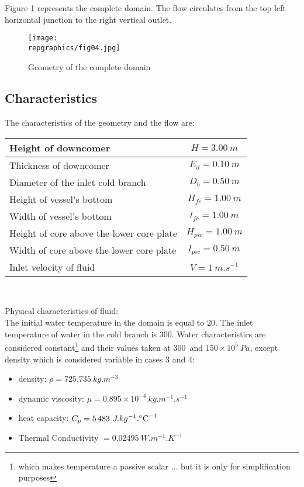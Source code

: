 Figure \ref{figante21} represents the complete domain. The flow circulates from
the top left horizontal junction to the right vertical outlet.

\begin{figure}[h!]
\begin{center}
\texttt{[image: \\repgraphics/fig04.jpg]}
\caption{Geometry of the complete domain}
\label{figante21}
\end{center}
\end{figure}


        \subsection{Characteristics}

The characteristics of the geometry and the flow are:
\begin{center}
\begin{tabular}{|l|c|}
\hline
Height of downcomer & $H = 3.00\ m$ \\
\hline
Thickness of downcomer & $E_{d} = 0.10\ m$ \\
\hline
Diameter of the inlet cold branch & $D_{b} = 0.50\ m$ \\
\hline
Height of vessel's bottom & $H_{fc} = 1.00\ m$ \\
\hline
Width of vessel's bottom & $l_{fc} = 1.00\ m$ \\
\hline
Height of core above the lower core plate & $H_{pic} = 1.00\ m$ \\
\hline
Width of core above the lower core plate & $l_{pic} = 0.50\ m$ \\
\hline
Inlet velocity of fluid & $V = 1\ m.s^{-1}$ \\
\hline
\end{tabular}\\
\end{center}

Physical characteristics of fluid:\\
The initial water temperature in the domain is equal to 20\degresC.
The inlet temperature of water in the cold branch is 300\degresC.
Water characteristics are considered constant\footnote{which makes temperature a
passive scalar ... but it is only for simplification purposes} and their values taken at
300\degresC\ and $150\times 10^{5}\ Pa$, except density which is considered
variable in cases 3 and 4:
\begin{itemize}
        \item density: $\rho = 725.735\ kg.m^{-3}$
        \item dynamic viscosity: $\mu = 0.895\times10^{-4}\ kg.m^{-1}.s^{-1}$
        \item heat capacity: $C_{p} = 5\,483\ J.kg^{-1}.\mbox{\degresC}^{-1}$
        \item Thermal Conductivity $ = 0.02495\ W.m^{-1}.K^{-1}$
\end{itemize}



